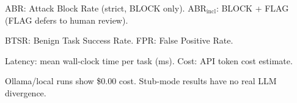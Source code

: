 \begin{table}[htbp]
\begin{tabular}{lllllrrrrrr}
    \bottomrule
  \end{tabular}
  \begin{tablenotes}
    \small
    \item ABR: Attack Block Rate (strict, BLOCK only). ABR$_{\text{incl}}$: BLOCK + FLAG (FLAG defers to human review).
    \item BTSR: Benign Task Success Rate. FPR: False Positive Rate.
    \item Latency: mean wall-clock time per task (ms). Cost: API token cost estimate.
    \item Ollama/local runs show \$0.00 cost. Stub-mode results have no real LLM divergence.
  \end{tablenotes}
\end{table}